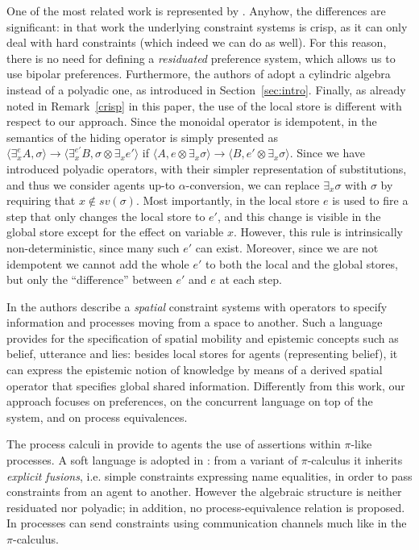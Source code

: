 \documentclass[preprint,12pt]{elsarticle}
\begin{document}
One of the most related work is represented by \cite{pippo}. Anyhow, the differences are significant: in that work the underlying constraint systems is crisp, as it can only deal with hard constraints (which indeed we can do as well). For this reason, there is no need for defining a \emph{residuated} preference system, which allows us to use bipolar preferences. Furthermore, the authors of \cite{pippo} adopt a cylindric algebra instead of a polyadic one, as introduced in Section~\ref{sec:intro}. Finally, as already noted in Remark~\ref{crisp} in this paper, the use of the local store is different with respect to our approach.
Since the monoidal operator is idempotent, in \cite{pippo} the semantics 
of the hiding operator is simply presented as $\langle 
\exists^{e}_x A, \sigma \rangle \to \langle  \exists^{e'}_x B, \sigma \otimes \exists_x e' \rangle$ if $\langle 
A, e \otimes \exists_x \sigma \rangle \to \langle  B, e' \otimes \exists_x \sigma \rangle$. 
Since we have introduced polyadic operators, with their simpler representation of substitutions, and thus we consider agents up-to $\alpha$-conversion,
we can replace $\exists_x \sigma$ with $\sigma$ by requiring that $x \not \in sv(\sigma)$.
Most importantly, in \cite{pippo} the local store $e$ is used to fire a step that only changes the local store to $e'$, and this change is  visible in the global store except  for the effect on variable $x$. However, this rule is intrinsically non-deterministic, since many such $e'$ can exist. Moreover, since we are not idempotent we cannot add the whole $e'$ to both the local and the global stores, but only the ``difference'' between $e'$ and $e$ at each step. 

In \cite{spatialvalencia} the authors describe a \emph{spatial} constraint systems with operators to
specify information and processes moving from a space to another. Such a language provides for the specification of spatial mobility and epistemic concepts such as belief, utterance and lies: besides local stores for agents  (representing belief), it can express the epistemic notion of knowledge by means of a derived spatial operator that specifies global shared information. Differently from this work, our approach focuses on preferences, on the concurrent language on top of the system, and on process equivalences.

The process calculi in \cite{parrowlics,buscemi} provide  to agents the use of assertions within $\pi$-like processes. A soft language is adopted in \cite{buscemi}: from a variant of $\pi$-calculus it inherits \emph{explicit fusions}, i.e. simple constraints expressing name equalities, in order to pass constraints from an agent to another.
However the algebraic structure is neither residuated nor  polyadic; in addition, no process-equivalence relation is proposed.  In \cite{pi1,pi2}  processes can send constraints using communication channels much like in the $\pi$-calculus. 
\end{document}
